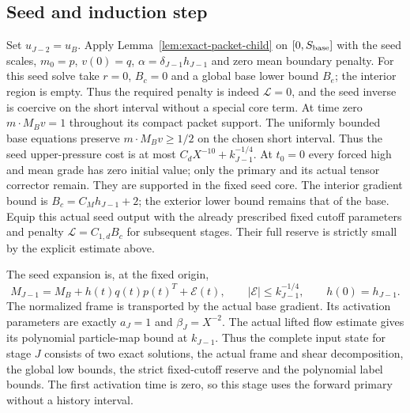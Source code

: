 \subsection{Seed and induction step}
Set $u_{J-2}=u_B$. Apply Lemma~\ref{lem:exact-packet-child} on
$[0,S_{\rm base}]$ with the seed scales, $m_0=p$, $v(0)=q$,
$\alpha=\delta_{J-1}h_{J-1}$ and zero mean boundary penalty.
For this seed solve take $r=0$, $B_c=0$ and a global base lower bound
$B_e$; the interior region is empty. Thus the required penalty is indeed
$\mathcal L=0$, and the seed inverse is coercive on the short interval
without a special core term.
At time zero $m\cdot M_Bv=1$ throughout its compact packet support.
The uniformly bounded base equations preserve $m\cdot M_Bv\geq1/2$
on the chosen short interval. Thus the seed upper-pressure cost is at
most $C_dX^{-10}+k_{J-1}^{-1/4}$.
At $t_0=0$ every forced high and mean grade has zero initial value;
only the primary and its actual tensor corrector remain. They are
supported in the fixed seed core. The interior gradient bound is
$B_c=C_Mh_{J-1}+2$; the exterior lower bound remains that of the base.
Equip this actual seed output with the already prescribed fixed cutoff
parameters and penalty $\mathcal L=C_{1,d}B_c$ for subsequent stages.
Their full reserve is strictly small by the explicit estimate above.

The seed expansion is, at the fixed origin,
\[
 M_{J-1}=M_B+h(t)q(t)p(t)^T+\mathcal E(t),\qquad
 |\mathcal E|\leq k_{J-1}^{-1/4},\qquad h(0)=h_{J-1}.
\]
The normalized frame is transported by the actual base gradient.
Its activation parameters are exactly $a_J=1$ and $\beta_J=X^{-2}$.
The actual lifted flow estimate gives its polynomial particle-map
bound at $k_{J-1}$. Thus the complete input state for stage $J$ consists
of two exact solutions, the actual frame and shear decomposition,
the global low bounds, the strict fixed-cutoff reserve and the polynomial
label bounds. The first activation time is zero, so this stage uses the forward
primary without a history interval.

